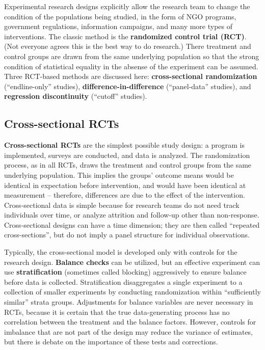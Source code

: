 Experimental research designs explicitly allow the research team
to change the condition of the populations being studied,
in the form of NGO programs, government regulations,
information campaigns, and many more types of interventions.\cite{banerjee2009experimental}
The classic method is the \textbf{randomized control trial (RCT)}.
(Not everyone agrees this is the best way to do research.)
There treatment and control groups are drawn from the same underlying population
so that the strong condition of statistical equality
in the absense of the experiment can be assumed.
Three RCT-based methods are discussed here:
\textbf{cross-sectional randomization} (``endline-only'' studies),
\textbf{difference-in-difference} (``panel-data'' studies),
and \textbf{regression discontinuity} (``cutoff'' studies).

\subsection{Cross-sectional RCTs}

\textbf{Cross-sectional RCTs} are the simplest possible study design:
a program is implemented, surveys are conducted, and data is analyzed.
The randomization process, as in all RCTs,
draws the treatment and control groups from the same underlying population.
This implies the groups' outcome means would be identical in expectation
before intervention, and would have been identical at measurement --
therefore, differences are due to the effect of the intervention.
Cross-sectional data is simple because
for research teams do not need track individuals over time,
or analyze attrition and follow-up other than non-response.
Cross-sectional designs can have a time dimension;
they are then called ``repeated cross-sections'',
but do not imply a panel structure for individual observations.

Typically, the cross-sectional model is developed
only with controls for the research design.
\textbf{Balance checks} can be utilized, but an effective experiment
can use \textbf{stratification} (sometimes called blocking) aggressively to ensure balance
before data is collected.\cite{athey2017econometrics}
Stratification disaggregates a single experiment to a collection
of smaller experiments by conducting randomization within
``sufficiently similar'' strata groups.
Adjustments for balance variables are never necessary in RCTs,
because it is certain that the true data-generating process
has no correlation between the treatment and the balance factors.
However, controls for imbalance that are not part of the design
may reduce the variance of estimates, but there is debate on
the importance of these tests and corrections.

